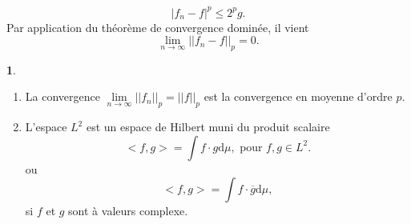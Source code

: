 \documentclass[8pt,notheorems]{beamer}
\theoremstyle{definition}
\theoremstyle{example}
\newtheorem{remark}{\translate{Remarque}}
\theoremstyle{mystyle}
\theoremstyle{plain}
\begin{document}
\begin{frame}[allowframebreaks]
$$
|f_n-f|^p\leq 2^{p}g.
$$
Par application du théorème de convergence dominée, il vient 
$$
\underset{n\rightarrow \infty}{\lim}||f_n - f||_p = 0.
$$
\begin{remark}
\begin{enumerate}
    \item La convergence $\underset{n\rightarrow \infty}{\lim}||f_n||_p=||f||_p $ est la convergence en moyenne d'ordre $p$.
    \item L'espace $L^2$ est un espace de Hilbert muni du produit scalaire 
    $$
    <f,g> = \int f\cdot g\text{d}\mu,\text{ pour }f,g\in L^2.
    $$
    ou
    $$
    <f,g> = \int f\cdot \overline{g}\text{d}\mu,
    $$
    si $f$ et $g$ sont à valeurs complexe.
\end{enumerate}
\end{remark}
\end{frame}
\end{document}
